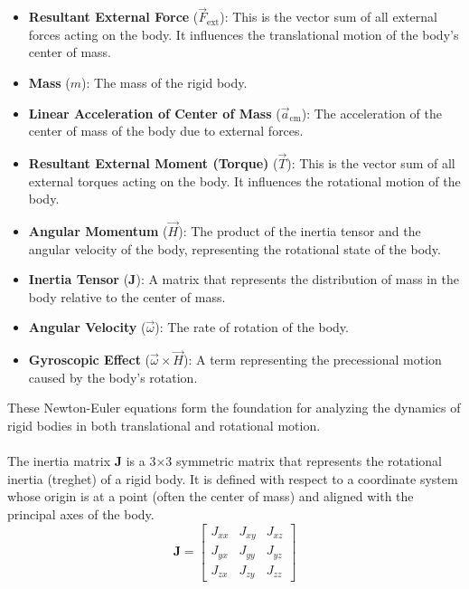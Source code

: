 \begin{itemize}
    \item \textbf{Resultant External Force} (\( \vec{F}_{\text{ext}} \)): This is the vector sum of all external forces acting on the body. It influences the translational motion of the body's center of mass.
    \item \textbf{Mass} (\( m \)): The mass of the rigid body.
    \item \textbf{Linear Acceleration of Center of Mass} (\( \vec{a}_{\text{cm}} \)): The acceleration of the center of mass of the body due to external forces.
    \item \textbf{Resultant External Moment (Torque)} (\( \vec{T} \)): This is the vector sum of all external torques acting on the body. It influences the rotational motion of the body.
    \item \textbf{Angular Momentum} (\( \vec{H} \)): The product of the inertia tensor and the angular velocity of the body, representing the rotational state of the body.
    \item \textbf{Inertia Tensor} (\( \mathbf{J} \)): A matrix that represents the distribution of mass in the body relative to the center of mass.
    \item \textbf{Angular Velocity} (\( \vec{\omega} \)): The rate of rotation of the body.
    \item \textbf{Gyroscopic Effect} (\( \vec{\omega} \times \vec{H} \)): A term representing the precessional motion caused by the body's rotation.
\end{itemize}

These Newton-Euler equations form the foundation for analyzing the dynamics of rigid bodies in both translational and rotational motion.
\\
\\


The inertia matrix \textbf{J} is a 3×3 symmetric matrix that represents the rotational inertia (treghet) of a rigid body. It is defined with respect to a coordinate system whose origin is at a point (often the center of mass) and aligned with the principal axes of the body.
\[
\mathbf{J} = \begin{bmatrix}
    J_{xx} & J_{xy} & J_{xz} \\
    J_{yx} & J_{yy} & J_{yz} \\
    J_{zx} & J_{zy} & J_{zz}
\end{bmatrix}
\]
